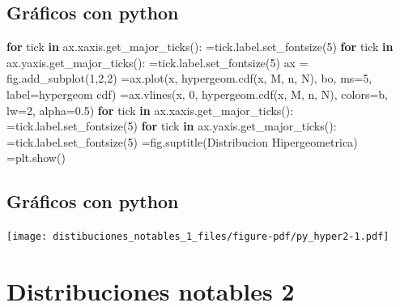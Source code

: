 \documentclass[
  letterpaper,
  DIV=11,
  numbers=noendperiod]{scrreprt}
\newenvironment{Shaded}{\begin{snugshade}}{\end{snugshade}}
\newcommand{\ControlFlowTok}[1]{\textcolor[rgb]{0.00,0.23,0.31}{\textbf{#1}}}
\newcommand{\DecValTok}[1]{\textcolor[rgb]{0.68,0.00,0.00}{#1}}
\newcommand{\FloatTok}[1]{\textcolor[rgb]{0.68,0.00,0.00}{#1}}
\newcommand{\KeywordTok}[1]{\textcolor[rgb]{0.00,0.23,0.31}{\textbf{#1}}}
\newcommand{\NormalTok}[1]{\textcolor[rgb]{0.00,0.23,0.31}{#1}}
\newcommand{\OperatorTok}[1]{\textcolor[rgb]{0.37,0.37,0.37}{#1}}
\newcommand{\StringTok}[1]{\textcolor[rgb]{0.13,0.47,0.30}{#1}}
\begin{document}
\section{Gráficos con python}\label{gruxe1ficos-con-python-6}

\begin{Shaded}
\begin{Highlighting}[]
\ControlFlowTok{for}\NormalTok{ tick }\KeywordTok{in}\NormalTok{ ax.xaxis.get\_major\_ticks():}
   \OperatorTok{=}\NormalTok{tick.label.set\_fontsize(}\DecValTok{5}\NormalTok{)}
\ControlFlowTok{for}\NormalTok{ tick }\KeywordTok{in}\NormalTok{ ax.yaxis.get\_major\_ticks():}
  \OperatorTok{=}\NormalTok{tick.label.set\_fontsize(}\DecValTok{5}\NormalTok{) }
\NormalTok{ax }\OperatorTok{=}\NormalTok{ fig.add\_subplot(}\DecValTok{1}\NormalTok{,}\DecValTok{2}\NormalTok{,}\DecValTok{2}\NormalTok{)}
 \OperatorTok{=}\NormalTok{ax.plot(x, hypergeom.cdf(x, M, n, N), }\StringTok{\textquotesingle{}bo\textquotesingle{}}\NormalTok{, ms}\OperatorTok{=}\DecValTok{5}\NormalTok{, label}\OperatorTok{=}\StringTok{\textquotesingle{}hypergeom cdf\textquotesingle{}}\NormalTok{)}
 \OperatorTok{=}\NormalTok{ax.vlines(x, }\DecValTok{0}\NormalTok{, hypergeom.cdf(x, M, n, N), colors}\OperatorTok{=}\StringTok{\textquotesingle{}b\textquotesingle{}}\NormalTok{, lw}\OperatorTok{=}\DecValTok{2}\NormalTok{, alpha}\OperatorTok{=}\FloatTok{0.5}\NormalTok{)}
\ControlFlowTok{for}\NormalTok{ tick }\KeywordTok{in}\NormalTok{ ax.xaxis.get\_major\_ticks():}
   \OperatorTok{=}\NormalTok{tick.label.set\_fontsize(}\DecValTok{5}\NormalTok{)}
\ControlFlowTok{for}\NormalTok{ tick }\KeywordTok{in}\NormalTok{ ax.yaxis.get\_major\_ticks():}
   \OperatorTok{=}\NormalTok{tick.label.set\_fontsize(}\DecValTok{5}\NormalTok{)}
 \OperatorTok{=}\NormalTok{fig.suptitle(}\StringTok{\textquotesingle{}Distribucion Hipergeometrica\textquotesingle{}}\NormalTok{)}
 \OperatorTok{=}\NormalTok{plt.show()}
\end{Highlighting}
\end{Shaded}

\section{Gráficos con python}\label{gruxe1ficos-con-python-7}

\begin{center}
\texttt{[image: distibuciones\_notables\_1\_files/figure-pdf/py\_hyper2-1.pdf]}
\end{center}

\chapter{Distribuciones notables 2}\label{distribuciones-notables-2}
\end{document}
